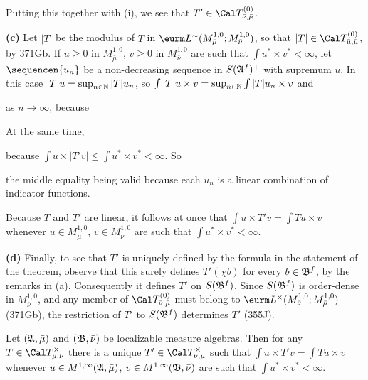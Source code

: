 {Putting this together with (i), we see that $T'\in \Cal
T^{(0)}_{\bar\nu,\bar\mu}$.\ \Qed
     
\medskip
     
{\bf (c)} Let $|T|$ be the modulus of $T$ in
$\eurm L^{\sim}(M^{1,0}_{\bar\mu};M^{1,0}_{\bar\nu})$, so that
$|T|\in\Cal T^{(0)}_{\bar\mu,\bar\mu}$, by 371Gb.   If $u\ge 0$ in
$M^{1,0}_{\bar\mu}$, $v\ge 0$ in $M^{1,0}_{\bar\nu}$ are such that $\int
u^*\times v^*<\infty$, let $\sequencen{u_n}$ be a
non-decreasing sequence in $S(\frak A^f)^+$ with supremum $u$.   In this
case $|T|u=\sup_{n\in\Bbb N}|T|u_n$, so $\int|T|u\times v=\sup_{n\in\Bbb
N}\int|T|u_n\times v$ and
     
     
\noindent as $n\to\infty$, because
     
     
\noindent   At the same time,
     
     
\noindent because $\int u\times|T'v|\le\int u^*\times v^*<\infty$.   So
     
     
\noindent the middle equality being valid because each $u_n$ is a linear
combination of indicator functions.
     
Because $T$ and $T'$ are linear, it follows at once that
$\int u\times T'v=\int Tu\times v$ whenever $u\in M^{1,0}_{\bar\mu}$,
$v\in M^{1,0}_{\bar\nu}$ are such that $\int u^*\times v^*<\infty$.
     
\medskip
     
{\bf (d)} Finally, to see that $T'$ is uniquely defined by the formula
in the statement of the theorem, observe that this surely defines
$T'(\chi b)$ for every $b\in\frak B^f$, by the remarks in (a).
Consequently it defines $T'$ on $S(\frak B^f)$.   Since $S(\frak B^f)$
is order-dense in $M^{1,0}_{\bar\nu}$, and any member of
$\Cal T^{(0)}_{\bar\nu,\bar\mu}$ must belong to
$\eurm L^{\times}(M^{1,0}_{\bar\nu};M^{1,0}_{\bar\mu})$ (371Gb), the
restriction of $T'$ to $S(\frak B^f)$ determines $T'$ (355J).
}%
     
 Let $(\frak A,\bar\mu)$ and $(\frak B,\bar\nu)$
be localizable measure algebras.   Then for any 
$T\in\Cal T^{\times}_{\bar\mu,\bar\nu}$ there is a unique
$T'\in\Cal T^{\times}_{\bar\nu,\bar\mu}$ such that 
$\int u\times T'v=\int Tu\times v$ whenever 
$u\in M^{1,\infty}(\frak A,\bar\mu)$,
$v\in M^{1,\infty}(\frak B,\bar\nu)$ are such that 
$\int u^*\times v^*<\infty$.
     

